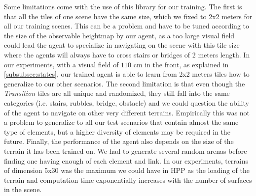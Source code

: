 Some limitations come with the use of this library for our training.
The first is that all the tiles of one scene have the same size, which we fixed to 2x2 meters for all our training scenes. 
This can be a problem and have to be tuned according to the size of the observable heightmap by our agent, as a too large visual field could lead the agent to specialize in navigating on the scene with this tile size where the agents will always have to cross stairs or bridges of 2 meters length. 
In our experiments, with a visual field of $110$ cm in the front, as explained in \ref{subsubsec:states}, our trained agent is able to learn from 2x2 meters tiles how to generalize to our other scenarios.
The second limitation is that even though the \textit{Transition} tiles are all unique and randomized, they still fall into the same categories (i.e. stairs, rubbles, bridge, obstacle) and we could question the ability of the agent to navigate on other very different terrains. Empirically this was not a problem to generalize to all our test scenarios that contain almost the same type of elements, but a higher diversity of elements may be required in the future.
Finally, the performance of the agent also depends on the size of the terrain it has been trained on. We had to generate several random arenas before finding one having enough of each element and link. 
In our experiments, terrains of dimension 5x30 was the maximum we could have in HPP as the loading of the terrain and computation time exponentially increases with the number of surfaces in the scene.

